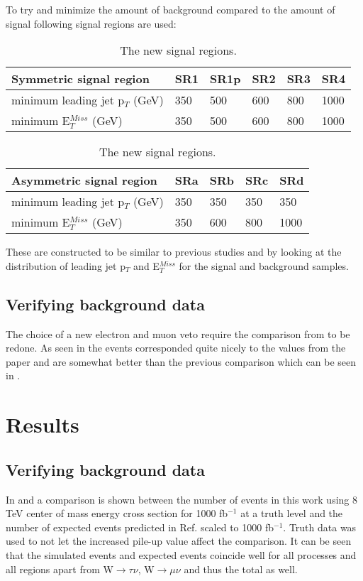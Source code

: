 To try and minimize the amount of background compared to the amount of signal following  signal regions are used:
\begin{table}[h]
\renewcommand{\arraystretch}{1.2} %
\begin{center}
\begin{tabular}{l l l l l l}
\hline
Symmetric signal region & SR1 & SR1p & SR2 & SR3 & SR4 \\ \hline
minimum leading jet p$_T$ (GeV) & 350 &500& 600 & 800 & 1000 \\
minimum E$^{Miss}_T$ (GeV) & 350&500 & 600 & 800 & 1000 \\
\end{tabular}
\begin{tabular}{l l l l l} \hline
Asymmetric signal region & SRa &  SRb & SRc & SRd \\ \hline
minimum leading jet p$_T$ (GeV) & 350 & 350 & 350 & 350 \\
minimum E$^{Miss}_T$ (GeV) & 350 & 600 & 800 & 1000 \\ \hline
\end{tabular}
\caption{The new signal regions.}
\label{tab:newsr}
\end{center}
\renewcommand{\arraystretch}{1.0} %
\end{table}

These are constructed to be similar to previous studies and by looking at the distribution of leading jet p$_T$  and  E$^{Miss}_T$ for the signal and background samples. 
\subsection{Verifying background data}
The choice of a new electron and muon veto require the comparison from  to be redone. As seen in  the events corresponded quite nicely to the values from the paper and are somewhat better than the previous comparison which can be seen in .

\newpage
\section{Results}\label{chap:sig:sec:res}
\subsection{Verifying background data}\label{Verifying background data}
In  and  a comparison is shown between the number of events in this work using 8 TeV center of mass energy cross section for 1000 fb$^{-1}$ at a truth level and the number of expected events predicted in Ref. \citep{ATLAS-CONF-2012-147} scaled to 1000 fb$^{-1}$. Truth data was used to not let the increased pile-up value affect the comparison. It can be seen that the simulated events and expected events coincide well for all processes and all regions apart from W$\rightarrow\tau\nu$, W$\rightarrow\mu\nu$ and thus the total as well. 

